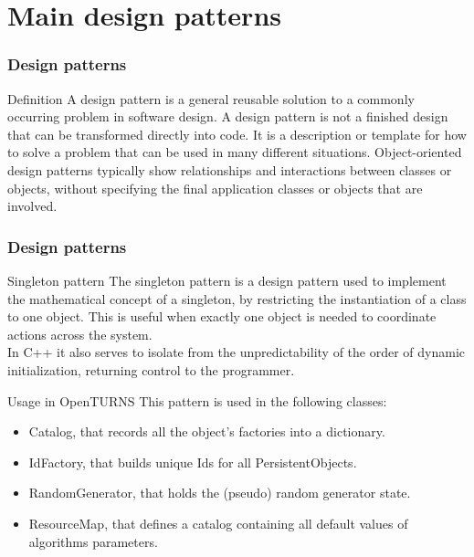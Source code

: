 \documentclass[8pt]{beamer}
\begin{document}
\section[Main design patterns]{Main design patterns}
\begin{frame}
  \frametitle{Design patterns}
  \begin{block}{Definition}
    A \alert{design pattern} is a general reusable solution to a commonly occurring problem in software design. A design pattern is not a finished design that can be transformed directly into code. It is a description or template for how to solve a problem that can be used in many different situations. Object-oriented design patterns typically show relationships and interactions between classes or objects, without specifying the final application classes or objects that are involved.
  \end{block}
\end{frame}
\begin{frame}
  \frametitle{Design patterns}
  \begin{block}{Singleton pattern}
    The \alert{singleton pattern} is a design pattern used to implement the mathematical concept of a singleton, by restricting the instantiation of a class to one object. This is useful when exactly one object is needed to coordinate actions across the system.\\
    In C++ it also serves to isolate from the unpredictability of the order of dynamic initialization, returning control to the programmer.
  \end{block}
  \begin{block}{Usage in OpenTURNS}
    This pattern is used in the following classes:
    \begin{itemize}
    \item \alert{Catalog}, that records all the object's factories into a dictionary.
    \item \alert{IdFactory}, that builds unique Ids for all PersistentObjects.
    \item \alert{RandomGenerator}, that holds the (pseudo) random generator state.
    \item \alert{ResourceMap}, that defines a catalog containing all default values of algorithms parameters.
    \end{itemize}
  \end{block}
\end{frame}
\end{document}
